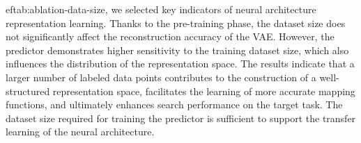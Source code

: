 \documentclass[../main_zh.tex]{subfiles}
\begin{document}
ef{tab:ablation-data-size}, we selected key indicators of neural architecture representation learning. Thanks to the pre-training phase, the dataset size does not significantly affect the reconstruction accuracy of the VAE. However, the predictor demonstrates higher sensitivity to the training dataset size, which also influences the distribution of the representation space. The results indicate that a larger number of labeled data points contributes to the construction of a well-structured representation space, facilitates the learning of more accurate mapping functions, and ultimately enhances search performance on the target task. The dataset size required for training the predictor is sufficient to support the transfer learning of the neural architecture.
\end{document}

